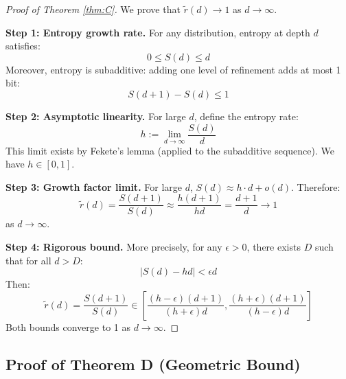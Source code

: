 \documentclass[11pt,a4paper]{article}
\theoremstyle{definition}
\theoremstyle{remark}
\newcommand{\rtilde}{\tilde{r}}
\begin{document}
\begin{proof}[Proof of Theorem \ref{thm:C}]
We prove that $\rtilde(d) \to 1$ as $d \to \infty$.

\textbf{Step 1: Entropy growth rate.}
For any distribution, entropy at depth $d$ satisfies:
\begin{equation}
    0 \leq S(d) \leq d
\end{equation}
Moreover, entropy is subadditive: adding one level of refinement adds at most 1 bit:
\begin{equation}
    S(d+1) - S(d) \leq 1
\end{equation}

\textbf{Step 2: Asymptotic linearity.}
For large $d$, define the entropy rate:
\begin{equation}
    h := \lim_{d \to \infty} \frac{S(d)}{d}
\end{equation}
This limit exists by Fekete's lemma (applied to the subadditive sequence). We have $h \in [0, 1]$.

\textbf{Step 3: Growth factor limit.}
For large $d$, $S(d) \approx h \cdot d + o(d)$. Therefore:
\begin{equation}
    \rtilde(d) = \frac{S(d+1)}{S(d)} \approx \frac{h(d+1)}{hd} = \frac{d+1}{d} \to 1
\end{equation}
as $d \to \infty$.

\textbf{Step 4: Rigorous bound.}
More precisely, for any $\epsilon > 0$, there exists $D$ such that for all $d > D$:
\begin{equation}
    |S(d) - hd| < \epsilon d
\end{equation}
Then:
\begin{equation}
    \rtilde(d) = \frac{S(d+1)}{S(d)} \in \left[\frac{(h-\epsilon)(d+1)}{(h+\epsilon)d}, \frac{(h+\epsilon)(d+1)}{(h-\epsilon)d}\right]
\end{equation}
Both bounds converge to 1 as $d \to \infty$.
\end{proof}

\subsection{Proof of Theorem D (Geometric Bound)}
\end{document}
